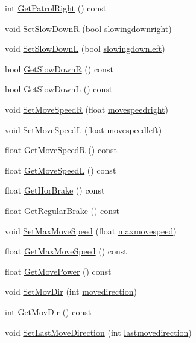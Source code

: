 \begin{DoxyCompactItemize}
int \hyperlink{classAI_afbdc815ba4215f0fcaca85f304ad88bf}{Get\+Patrol\+Right} () const 
\item 
void \hyperlink{classAI_a57045e1587ca559b44019190a2433e07}{Set\+Slow\+DownR} (bool \hyperlink{classAI_a4ae562cbe6afd5d010d5329c0c926459}{slowingdownright})
\item 
void \hyperlink{classAI_ab07dcb050c20c646927e16e2ead40728}{Set\+Slow\+DownL} (bool \hyperlink{classAI_a33b48858d468564363727d20164f2c54}{slowingdownleft})
\item 
bool \hyperlink{classAI_a144406629e0344569a28b1f02c1503ad}{Get\+Slow\+DownR} () const 
\item 
bool \hyperlink{classAI_ab0d09d0379209305cdbedff71615be8e}{Get\+Slow\+DownL} () const 
\item 
void \hyperlink{classAI_a171141e877f08757696a65e3d9305660}{Set\+Move\+SpeedR} (float \hyperlink{classAI_a5b9ee08216e80b40ef278c0b8e71bdf2}{movespeedright})
\item 
void \hyperlink{classAI_a7e52788a6f93f78feaa0c8867f454888}{Set\+Move\+SpeedL} (float \hyperlink{classAI_aa4053f5803c847fc13db08bc8cd6737b}{movespeedleft})
\item 
float \hyperlink{classAI_af237abb2520be87abb2fc709b23736ec}{Get\+Move\+SpeedR} () const 
\item 
float \hyperlink{classAI_a727dd212a4f6dea5030399943b66a285}{Get\+Move\+SpeedL} () const 
\item 
float \hyperlink{classAI_a492eb8602d131ddd7d1002a5175c677b}{Get\+Hor\+Brake} () const 
\item 
float \hyperlink{classAI_a12164015cfb14576341e0cd31939927a}{Get\+Regular\+Brake} () const 
\item 
void \hyperlink{classAI_a4423ec546f1d37cec368321e119ac6b0}{Set\+Max\+Move\+Speed} (float \hyperlink{classAI_a3af9cf8b86fff09d7e95ed913636e18a}{maxmovespeed})
\item 
float \hyperlink{classAI_a7b6da292ee6fde22465b2a956c1c1aff}{Get\+Max\+Move\+Speed} () const 
\item 
float \hyperlink{classAI_aa6c83658cc7028645288d90dac360ba4}{Get\+Move\+Power} () const 
\item 
void \hyperlink{classAI_a7b1fa9a0546e462e633bbdcbbf12eb50}{Set\+Mov\+Dir} (int \hyperlink{classAI_ac23347ccaa9f699521417509ab73e271}{movedirection})
\item 
int \hyperlink{classAI_af44b60f433e7046939fa564f17e4655f}{Get\+Mov\+Dir} () const 
\item 
void \hyperlink{classAI_abc21616a023e18fe33740326b22b21fa}{Set\+Last\+Move\+Direction} (int \hyperlink{classAI_ad23ffbd48fb9fd95ec18df649810b766}{lastmovedirection})

\end{DoxyCompactItemize}
